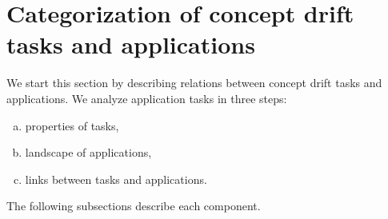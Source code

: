 \documentclass{llncs}
\begin{document}
%
%
%
%

\section{Categorization of concept drift tasks and applications}
\label{sec:framework}

We start this section by describing relations between concept drift tasks and applications.
We analyze application tasks in three steps:
\begin{enumerate}[(a)]
\item properties of tasks,
\item landscape of applications,
\item links between tasks and applications.
\end{enumerate}
The following subsections describe each component.
\end{document}
